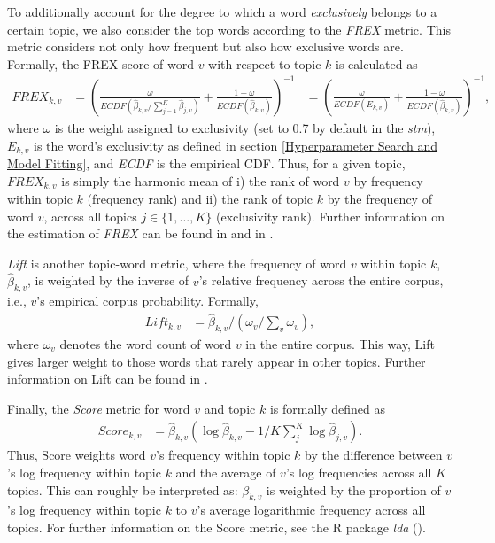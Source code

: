 To additionally account for the degree to which a word \textit{exclusively} belongs to a certain topic, we also consider the top words according to the \textit{FREX} metric. This metric considers not only how frequent but also how exclusive words are. Formally, the FREX score of word $v$ with respect to topic $k$ is calculated as
\begin{align*}
FREX_{k,v} &= (\frac{\omega}{ECDF(\hat{\beta}_{k,v}/\sum_{j=1}^{K}\hat{\beta}_{j,v})} + \frac{1-\omega}{ECDF(\hat{\beta}_{k,v})})^{-1} &= (\frac{\omega}{ECDF(E_{k,v})} + \frac{1-\omega}{ECDF(\hat{\beta}_{k,v})})^{-1},
\end{align*}
where $\omega$ is the weight  assigned to exclusivity (set to 0.7 by default in the \textit{stm}), $E_{k,v}$ is the word's exclusivity as defined in section \ref{Hyperparameter Search and Model Fitting}, and \textit{ECDF} is the empirical CDF. Thus, for a given topic, $FREX_{k,v}$ is simply the harmonic mean of i) the rank of word $v$ by frequency within topic $k$ (frequency rank) and ii) the rank of topic $k$ by the frequency of word $v$, across all topics $j \in \{1,...,K\}$ (exclusivity rank). Further information on the estimation of \textit{FREX} can be found in \cite{stm} and in \cite{bischof2012summarizing}.

\textit{Lift} is another topic-word metric, where the frequency of word $v$ within topic $k$,  $\hat{\beta}_{k,v}$, is weighted by the inverse of $v$'s relative frequency across the entire corpus, i.e., $v$'s empirical corpus probability. Formally,
\begin{align*}
Lift_{k,v} &= \hat{\beta}_{k,v}/(\omega_{v}/\sum_{v}\omega_{v}),
\end{align*}
where $\omega_{v}$ denotes the word count of word $v$ in the entire corpus. This way, Lift gives larger weight to those words that rarely appear in other topics. Further information on Lift can be found in \cite{taddy2012estimation}.

Finally, the \textit{Score} metric for word $v$ and topic $k$ is formally defined as
\begin{align*}
Score_{k,v} &= \hat{\beta}_{k,v}(\log\hat{\beta}_{k,v} - 1/K\sum_{j}^{K}\log\hat{\beta}_{j,v}).
\end{align*}
Thus, Score weights word $v$'s frequency within topic $k$ by the difference between $v$'s log frequency within topic $k$ and the average of $v$'s log frequencies across all $K$ topics. This can roughly be interpreted as: $\beta_{k,v}$ is weighted by the proportion of $v$'s log frequency within topic $k$ to $v$'s average logarithmic frequency across all topics. For further information on the Score metric, see the R package \textit{lda} (\citealp{chang2010package}).

